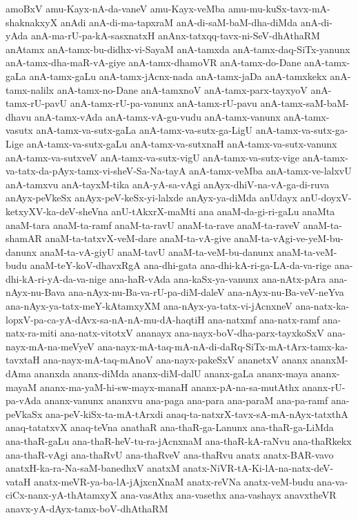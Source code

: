 {amoBxV
amu-Kayx-nA-da-vaneV
amu-Kayx-veMba
amu-mu-kuSx-tavx-mA-shaknakxyX
anAdi
anA-di-ma-tapxraM
anA-di-saM-baM-dha-diMda
anA-di-yAda
anA-ma-rU-pa-kA-sasxnatxH
anAnx-tatxqq-tavx-ni-SeV-dhAthaRM
anAtamx
anA-tamx-bu-didhx-vi-SayaM
anA-tamxda
anA-tamx-daq-SiTx-yanunx
anA-tamx-dha-maR-vA-giye
anA-tamx-dhamoVR
anA-tamx-do-Dane
anA-tamx-gaLa
anA-tamx-gaLu
anA-tamx-jAcnx-nada
anA-tamx-jaDa
anA-tamxkekx
anA-tamx-nalilx
anA-tamx-no-Dane
anA-tamxnoV
anA-tamx-parx-tayxyoV
anA-tamx-rU-pavU
anA-tamx-rU-pa-vanunx
anA-tamx-rU-pavu
anA-tamx-saM-baM-dhavu
anA-tamx-vAda
anA-tamx-vA-gu-vudu
anA-tamx-vanunx
anA-tamx-vasutx
anA-tamx-va-sutx-gaLa
anA-tamx-va-sutx-ga-LigU
anA-tamx-va-sutx-ga-Lige
anA-tamx-va-sutx-gaLu
anA-tamx-va-sutxnaH
anA-tamx-va-sutx-vanunx
anA-tamx-va-sutxveV
anA-tamx-va-sutx-vigU
anA-tamx-va-sutx-vige
anA-tamx-va-tatx-da-pAyx-tamx-vi-sheV-Sa-Na-tayA
anA-tamx-veMba
anA-tamx-ve-lalxvU
anA-tamxvu
anA-tayxM-tika
anA-yA-sa-vAgi
anAyx-dhiV-na-vA-ga-di-ruva
anAyx-peVkeSx
anAyx-peV-keSx-yi-lalxde
anAyx-ya-diMda
anUdayx
anU-doyxV-ketxyXV-ka-deV-sheVna
anU-tAkxrX-maMti
ana
anaM-da-gi-ri-gaLu
anaMta
anaM-tara
anaM-ta-ramf
anaM-ta-ravU
anaM-ta-rave
anaM-ta-raveV
anaM-ta-shamAR
anaM-ta-tatxvX-veM-dare
anaM-ta-vA-give
anaM-ta-vAgi-ve-yeM-bu-danunx
anaM-ta-vA-giyU
anaM-tavU
anaM-ta-veM-bu-danunx
anaM-ta-veM-budu
anaM-teY-koV-dhavxRgA
ana-dhi-gata
ana-dhi-kA-ri-ga-LA-da-va-rige
ana-dhi-kA-ri-yA-da-va-nige
ana-haR-vAda
ana-kaSx-ya-vanunx
ana-nAtx-pAra
ana-nAyx-nu-Bava
ana-nAyx-nu-Ba-va-rU-pa-diM-daleV
ana-nAyx-nu-Ba-veV-neYva
ana-nAyx-ya-tatx-meY-kAtamxyXM
ana-nAyx-ya-tatx-vi-jAcnxneV
ana-natx-ka-lopxV-pa-ca-yA-dAvx-sa-nA-nA-mu-dA-haqtiH
ana-natxmf
ana-natx-ramf
ana-natx-ra-miti
ana-natx-vitotxV
ananayx
ana-nayx-boV-dha-parx-tayxkoSxV
ana-nayx-mA-na-meVyeV
ana-nayx-mA-taq-mA-nA-di-daRq-SiTx-mA-tArx-tamx-ka-tavxtaH
ana-nayx-mA-taq-mAnoV
ana-nayx-pakeSxV
ananetxV
ananx
ananxM-dAma
ananxda
ananx-diMda
ananx-diM-dalU
ananx-gaLa
ananx-maya
ananx-mayaM
ananx-ma-yaM-hi-sw-mayx-manaH
ananx-pA-na-sa-mutAthx
ananx-rU-pa-vAda
ananx-vanunx
ananxvu
ana-paga
ana-para
ana-paraM
ana-pa-ramf
ana-peVkaSx
ana-peV-kiSx-ta-mA-tArxdi
anaq-ta-natxrX-tavx-sA-mA-nAyx-tatxthA
anaq-tatatxvX
anaq-teVna
anathaR
ana-thaR-ga-Lanunx
ana-thaR-ga-LiMda
ana-thaR-gaLu
ana-thaR-heV-tu-ra-jAcnxnaM
ana-thaR-kA-raNvu
ana-thaRkekx
ana-thaR-vAgi
ana-thaRvU
ana-thaRveV
ana-thaRvu
anatx
anatx-BAR-vavo
anatxH-ka-ra-Na-saM-banedhxV
anatxM
anatx-NiVR-tA-Ki-lA-na-natx-deV-vataH
anatx-meVR-ya-ba-lA-jAjxcnXnaM
anatx-reVNa
anatx-veM-budu
ana-va-ciCx-nanx-yA-thAtamxyX
ana-vasAthx
ana-vasethx
ana-vashayx
anavxtheVR
anavx-yA-dAyx-tamx-boV-dhAthaRM
}
